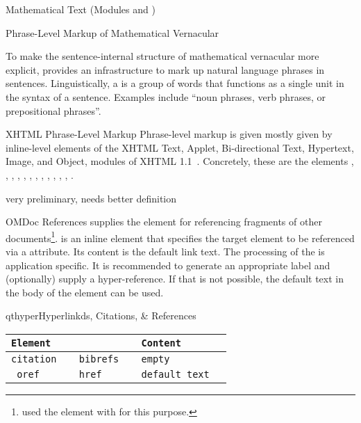\begin{tchapter}[id=mtxt,short=Mathematical Text]{Mathematical Text (Modules
  {} and {})}
\begin{tsection}[id=phrases]{Phrase-Level Markup of Mathematical Vernacular}

  To make the sentence-internal structure of mathematical vernacular more explicit,
  {\omdoc} provides an infrastructure to mark up natural language phrases in
  sentences. Linguistically, a {} is a group of words that functions as a
  single unit in the syntax of a sentence. Examples include ``noun phrases, verb phrases,
  or prepositional phrases''. 

\begin{tsubsection}{XHTML Phrase-Level Markup}
  Phrase-level markup is given mostly given by inline-level elements of the XHTML Text,
  Applet, Bi-directional Text, Hypertext, Image, and Object, modules of XHTML
  1.1~\cite{McCarron:xhtmlmods1.1}. Concretely, these are the elements ,
  , , , , ,
  , , , , ,
  , .
\end{tsubsection}


\begin{newpart}{very preliminary, needs better definition}
\begin{tsubsection}{OMDoc References}
  {\omdoc} supplies the {} element for referencing fragments of other
  documents\footnote{{} used the {} element with
    {} {} for this
    purpose.}. {} is an inline element that specifies the target element to
  be referenced via a {} attribute. Its content is the default link
  text.  The processing of the {} is application specific. It is
  recommended to generate an appropriate label and (optionally) supply a
  hyper-reference. If that is not possible, the default text in the body of the
   element can be used.
\end{tsubsection}
\end{newpart}

\begin{myfig}{qthyper}{Hyperlinkds, Citations, \& References}
  \begin{scriptsize}
\begin{tabular}{|>{\tt}l|>{\tt}l|>{\tt}l|>{\tt}l|}\hline
{\rm Element}& \multicolumn{2}{l|}{Attributes\hspace*{2.25cm}} & Content  \\\hline
 citation & bibrefs & empty \\\hline
 oref & href & default text\\\hline
\end{tabular}
\end{scriptsize}
\end{myfig}


\end{tsection}
\end{tchapter}
